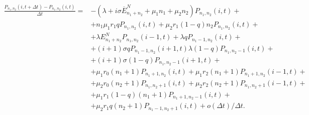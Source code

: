 \begin{equation*}
	\begin{split}
\frac{P_{n_{1}, n_{2}}(i,t+\Delta t) - P_{n_{1}, n_{2}}(i, t)}{\Delta t}=&-(\lambda+i\sigma \overline{E}_{n_{1}+n_{2}}^N+\mu_{1}n_{1}+\mu_{2}n_{2})P_{n_{1}, n_{2}}(i,t)+\\
&+ n_{1}\mu_{1}r_{1}qP_{n_{1}, n_{2}}(i,t)+ \mu_{2}r_{1}(1-q)n_{2}P_{n_{1}, n_{2}}(i,t)+\\
&+ \lambda E_{n_{1}+n_{2}}^N P_{n_{1}, n_{2}}(i-1,t)+\lambda qP_{n_{1}-1, n_{2}}(i,t)+\\
&+ (i+1) \sigma q P_{n_{1}-1, n_{2}}(i+1,t)\lambda (1-q)P_{n_{1}, n_{2}-1}(i,t) +\\
&+ (i+1) \sigma (1-q) P_{n_{1}, n_{2}-1}(i+1,t)+\\
&+ \mu_{1} r_{0}(n_{1}+1) P_{n_{1} +1 , n_{2}}(i,t) + \mu_{1} r_{2} (n_{1}+1) P_{n_{1} + 1, n_{2}}(i-1,t)+\\
&+ \mu_{2} r_{0}(n_{2}+1) P_{n_{1}, n_{2} + 1 }(i,t)+\mu_{2} r_{2} (n_{2}+1) P_{n_{1}, n_{2} + 1}(i-1,t)+\\
&+\mu_{1} r_{1}(1-q)(n_{1}+1) P_{n_{1} +1 , n_{2}-1}(i,t)+\\
&+\mu_{2} r_{1}q (n_{2}+1)P_{n_{1} -1 , n_{2}+1}(i,t)+ o(\Delta t)/\Delta t.
\end{split}
\end{equation*}

